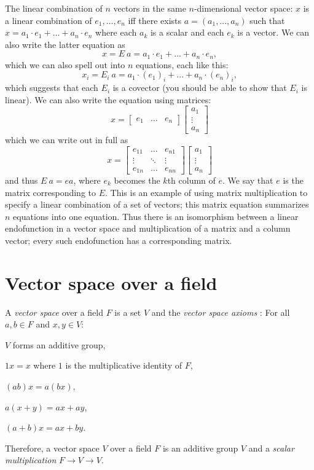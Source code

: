The linear combination of \(n\) vectors in the same \(n\)-dimensional vector space:
\(x\) is a linear combination of \(e_1,\ldots,e_n\)
iff there exists \(a = (a_1,\ldots,a_n)\)
such that \(x = a_1 \cdot e_1 + \ldots + a_n \cdot e_n\)
where each \(a_k\) is a scalar and each \(e_k\) is a vector.
We can also write the latter equation as
\[
x = E~a = a_1 \cdot e_1 + \ldots + a_n \cdot e_n,
\]
which we can also spell out into $n$ equations, each like this:
\[
x_i = E_i~a = a_1 \cdot (e_1)_i + \ldots + a_n \cdot (e_n)_i,
\]
which suggests that each $E_i$ is a covector
(you should be able to show that $E_i$ is linear).
We can also write the equation using matrices:
\[
x =
\begin{bmatrix}
e_1 & \ldots & e_n
\end{bmatrix}
\begin{bmatrix}
a_1 \\ \vdots \\ a_n
\end{bmatrix}
\]
which we can write out in full as
\[
x =
\begin{bmatrix}
e_{11} & \ldots & e_{n1}
\\ \vdots & \ddots & \vdots
\\ e_{1n} & \ldots & e_{nn}
\end{bmatrix}
\begin{bmatrix}
a_1 \\ \vdots \\ a_n
\end{bmatrix}
\]
and thus $E~a = ea$,
where $e_k$ becomes the $k$th column of $e$.
We say that $e$ is the matrix corresponding to $E$.
This is an example of using matrix multiplication to specify
a linear combination of a set of vectors;
this matrix equation summarizes $n$ equations into one equation.
Thus there is an isomorphism between a linear endofunction in a vector space
and multiplication of a matrix and a column vector;
every such endofunction has a corresponding matrix.

\section{Vector space over a field}

%
%
A \emph{vector space} over a field \(F\) is a set \(V\) and the
%
\emph{vector space axioms} \cite{wpvectorspace}\cite{roman2005advanced}:
For all \(a, b \in F\) and \(x, y \in V\):
\begin{enumerate*}[label={(\arabic*)}]
    \item \(V\) forms an additive group,
    \item \(1 x = x\) where \(1\) is the multiplicative identity of \(F\),
    \item \((ab)x = a(bx)\),
    \item \(a(x+y) = ax+ay\),
    \item \((a+b)x = ax+by\).
\end{enumerate*}
Therefore, a vector space \(V\) over a field \(F\) is
an additive group \(V\) and a \emph{scalar multiplication} \(F \to V \to V\).

